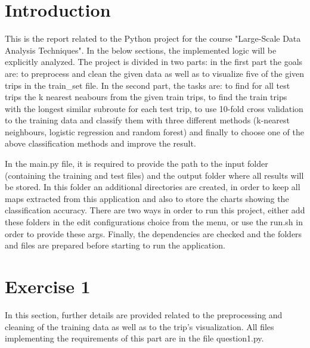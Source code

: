 \documentclass[12pt]{article}
\begin{document}
	\section{Introduction}
    This is the report related to the Python project for the course "Large-Scale Data Analysis Techniques". In the below sections, the implemented logic will be explicitly analyzed. The project is divided in two parts: in the first part the goals are: to preprocess and clean the given data as well as to visualize five of the given trips in the train\_set file. In the second part, the tasks are: to find for all test trips the k nearest neabours from the given train trips, to find the train trips with the longest similar subroute for each test trip, to use 10-fold cross validation to the training data and classify them with three different methods (k-nearest neighbours, logistic regression and random forest) and finally to choose one of the above classification methods and improve the result.
    
    In the main.py file, it is required to provide the path to the input folder (containing the training and test files) and the output folder where all results will be stored. In this folder an additional directories are created, in order to keep all maps extracted from this application and also to store the charts showing the classification accuracy. There are two ways in order to run this project, either add these folders in the edit configurations choice from the menu, or use the run.sh in order to provide these args. Finally, the dependencies are checked and the folders and files are prepared before starting to run the application.
    
	\section{Exercise 1}
	In this section, further details are provided related to the preprocessing and cleaning of the training data as well as to the trip's visualization. All files implementing the requirements of this part are in the file question1.py.
	
\end{document}
